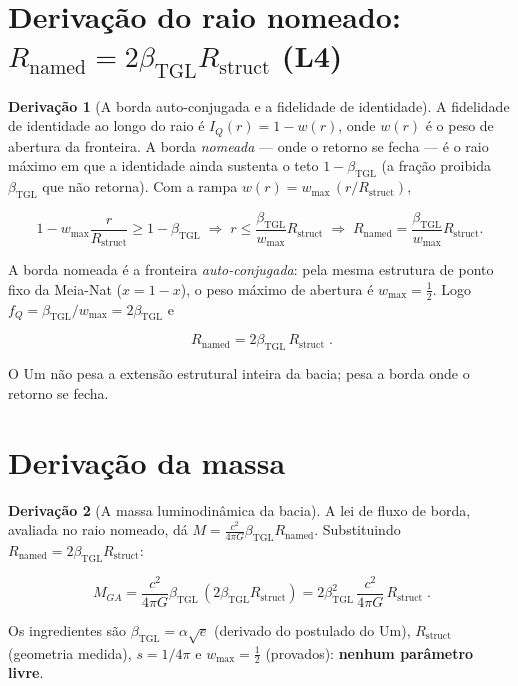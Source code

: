 \documentclass[11pt]{article}
\newcommand{\bTGL}{\beta_{\mathrm{TGL}}}\newcommand{\Msun}{M_{\odot}}\newcommand{\TGL}{\mathrm{TGL}}
\theoremstyle{definition}\newtheorem{deriv}{Derivação}
\begin{document}
\section{Derivação do raio nomeado: $R_{\mathrm{named}}=2\bTGL R_{\mathrm{struct}}$ (L4)}

\begin{deriv}[A borda auto-conjugada e a fidelidade de identidade]

A fidelidade de identidade ao longo do raio é $I_Q(r)=1-w(r)$, onde $w(r)$ é o peso de abertura da fronteira. A borda \emph{nomeada} --- onde o retorno se fecha --- é o raio máximo em que a identidade ainda sustenta o teto $1-\bTGL$ (a fração proibida $\bTGL$ que não retorna). Com a rampa $w(r)=w_{\max}\,(r/R_{\mathrm{struct}})$,

\begin{equation}1-w_{\max}\frac{r}{R_{\mathrm{struct}}}\geq 1-\bTGL\;\Longrightarrow\;r\leq\frac{\bTGL}{w_{\max}}R_{\mathrm{struct}}\;\Longrightarrow\;R_{\mathrm{named}}=\frac{\bTGL}{w_{\max}}R_{\mathrm{struct}}.\end{equation}

A borda nomeada é a fronteira \emph{auto-conjugada}: pela mesma estrutura de ponto fixo da Meia-Nat ($x=1-x$), o peso máximo de abertura é $w_{\max}=\tfrac12$. Logo $f_Q=\bTGL/w_{\max}=2\bTGL$ e

\begin{equation}\boxed{\;R_{\mathrm{named}}=2\bTGL\,R_{\mathrm{struct}}\;}.\end{equation}

O Um não pesa a extensão estrutural inteira da bacia; pesa a borda onde o retorno se fecha.\end{deriv}

\section{Derivação da massa}

\begin{deriv}[A massa luminodinâmica da bacia]

A lei de fluxo de borda, avaliada no raio nomeado, dá $M=\frac{c^2}{4\pi G}\bTGL R_{\mathrm{named}}$. Substituindo $R_{\mathrm{named}}=2\bTGL R_{\mathrm{struct}}$:

\begin{equation}\boxed{\;M_{GA}=\frac{c^2}{4\pi G}\bTGL\,(2\bTGL R_{\mathrm{struct}})=2\bTGL^2\,\frac{c^2}{4\pi G}\,R_{\mathrm{struct}}\;}.\end{equation}

Os ingredientes são $\bTGL=\alpha\sqrt{e}$ (derivado do postulado do Um), $R_{\mathrm{struct}}$ (geometria medida), $s=1/4\pi$ e $w_{\max}=\tfrac12$ (provados): \textbf{nenhum parâmetro livre}.\end{deriv}
\end{document}
